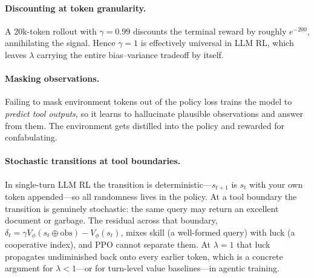 \paragraph{Discounting at token granularity.} A 20k-token rollout with
$\gamma = 0.99$ discounts the terminal reward by roughly $e^{-200}$, annihilating
the signal. Hence $\gamma = 1$ is effectively universal in LLM RL, which leaves
$\lambda$ carrying the entire bias--variance tradeoff by itself.
  
\paragraph{Masking observations.} Failing to mask environment tokens out of the
policy loss trains the model to \emph{predict tool outputs}, so it learns to
hallucinate plausible observations and answer from them. The environment gets
distilled into the policy and rewarded for confabulating.
  
\paragraph{Stochastic transitions at tool boundaries.} In single-turn LLM RL the
transition is deterministic---$s_{t+1}$ is $s_t$ with your own token appended---so
all randomness lives in the policy. At a tool boundary the transition is genuinely
stochastic: the same query may return an excellent document or garbage. The
residual across that boundary,
$\delta_t = \gamma V_\phi(s_t \oplus \mathrm{obs}) - V_{\phi}(s_t)$, mixes skill (a
well-formed query) with luck (a cooperative index), and PPO cannot separate them.
At $\lambda=1$ that luck propagates undiminished back onto every earlier token,
which is a concrete argument for $\lambda<1$---or for turn-level value
baselines---in agentic training.